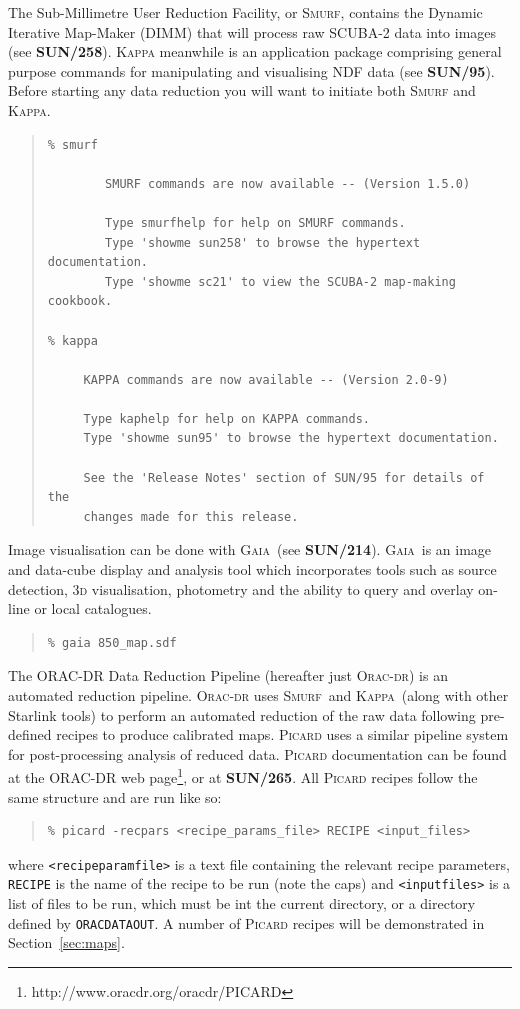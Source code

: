 \documentclass[twoside,11pt]{article}
\newcommand{\htmladdnormallinkfoot}[2]{#1\footnote{#2}}
\newcommand{\htmladdnormallink}[2]{#1}
\newcommand{\htmlref}[2]{#1}
\newcommand{\latexhtml}[2]{#1}
\newcommand{\xref}[3]{#1}
\renewcommand{\_}{\texttt{\symbol{95}}}
\newenvironment{myquote}{\begin{quote}\begin{small}}{\end{small}\end{quote}}
\newcommand{\gaia}{\xref{\textsc{Gaia}}{sun214}{}}
\newcommand{\Kappa}{\xref{\textsc{Kappa}}{sun95}{}}
\newcommand{\oracdr}{\htmladdnormallink{\textsc{Orac-dr}}{http://www.oracdr.org/oracdr}}
\newcommand{\smurf}{\xref{\textsc{Smurf}}{sun258}{}}
\newcommand{\param}[1]{\texttt{#1}}
\newcommand{\gaiasun}{\xref{\textbf{SUN/214}}{sun214}{}}
\newcommand{\kappasun}{\xref{\textbf{SUN/95}}{sun95}{}}
\newcommand{\picardsun}{\xref{\textbf{SUN/265}}{sun265}{}}
\newcommand{\smurfsun}{\xref{\textbf{SUN/258}}{sun258}{}}
\newcommand{\cref}[3]{\latexhtml{#1~\ref{#2}}{\htmlref{#3}{#2}}}
\begin{document}
The Sub-Millimetre User Reduction Facility, or \textsc{Smurf}, contains the
Dynamic Iterative Map-Maker (DIMM) that will process raw SCUBA-2 data
into images (see \smurfsun). \textsc{Kappa} meanwhile is an application
package comprising general purpose commands for manipulating and
visualising NDF data (see \kappasun). Before starting any data
reduction you will want to initiate both \textsc{Smurf} and \textsc{Kappa}.
\begin{myquote}
\begin{verbatim}
% smurf

        SMURF commands are now available -- (Version 1.5.0)

        Type smurfhelp for help on SMURF commands.
        Type 'showme sun258' to browse the hypertext documentation.
        Type 'showme sc21' to view the SCUBA-2 map-making cookbook.

% kappa

     KAPPA commands are now available -- (Version 2.0-9)

     Type kaphelp for help on KAPPA commands.
     Type 'showme sun95' to browse the hypertext documentation.

     See the 'Release Notes' section of SUN/95 for details of the
     changes made for this release.
\end{verbatim}
\end{myquote}
Image visualisation can be done with \gaia\ (see \gaiasun). \gaia\ is an
image and data-cube display and analysis tool which incorporates tools such
as source detection, 3\textsc{d} visualisation, photometry and the ability
to query and overlay on-line or local catalogues.
\begin{myquote}
\begin{verbatim}
% gaia 850_map.sdf
\end{verbatim}
\end{myquote}

The ORAC-DR Data Reduction Pipeline \cite{oracdr} (hereafter just
\oracdr) is an automated reduction pipeline.  \textsc{Orac-dr} uses \smurf\ and
\Kappa\ (along with other Starlink tools) to perform an automated
reduction of the raw data following pre-defined recipes to produce
calibrated maps. \textsc{Picard} uses a similar pipeline system for
post-processing analysis of reduced data. \textsc{Picard}
documentation can be found at \htmladdnormallinkfoot{the ORAC-DR web
page}{http://www.oracdr.org/oracdr/PICARD}, or at \picardsun. All
\textsc{Picard} recipes follow the same structure and are run like so:
\begin{myquote}
\begin{verbatim}
% picard -recpars <recipe_params_file> RECIPE <input_files>
\end{verbatim}
\end{myquote}
where \param{<recipe\_param\_file>} is a text file containing the
relevant recipe parameters, \param{RECIPE} is the name of the recipe
to be run (note the caps) and \param{<input\_files>} is a list of
files to be run, which must be int the current directory, or a
directory defined by \param{ORAC\_DATA\_OUT}. A number of \textsc{Picard}
recipes will be demonstrated in \cref{Section}{sec:maps}{Reducing your data}.
\end{document}
